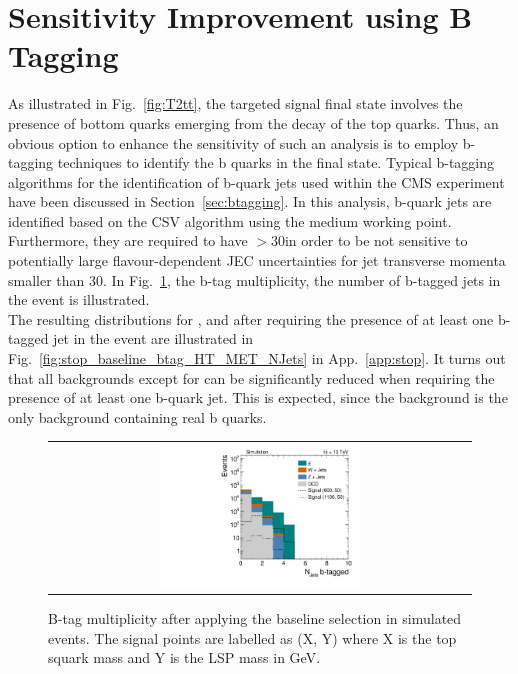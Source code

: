 \section{Sensitivity Improvement using B Tagging}
\label{sec:stop_btagging}
As illustrated in Fig.~\ref{fig:T2tt}, the targeted signal final state involves the presence of bottom quarks emerging from the decay of the top quarks. Thus, an obvious option to enhance the sensitivity of such an analysis is to employ b-tagging techniques to identify the b quarks in the final state. Typical b-tagging algorithms for the identification of b-quark jets used within the CMS experiment have been discussed in Section~\ref{sec:btagging}. In this analysis, b-quark jets are identified based on the CSV algorithm using the medium working point. Furthermore, they are required to have \pt$> 30$\gev in order to be not sensitive to potentially large flavour-dependent JEC uncertainties for jet transverse momenta smaller than 30\gev. In Fig.~\ref{fig:stop_baseline_btag}, the b-tag multiplicity, \ie the number of b-tagged jets in the event is illustrated. \\ %
The resulting distributions for \HT, \met and \NJets after requiring the presence of at least one b-tagged jet in the event are illustrated in Fig.~\ref{fig:stop_baseline_btag_HT_MET_NJets} in App.~\ref{app:stop}. It turns out that all backgrounds except for \ttbar can be significantly reduced when requiring the presence of at least one b-quark jet. This is expected, since the \ttbar background is the only background containing real b quarks.     
\begin{figure}[!t]
  \centering
  \begin{tabular}{c}
                \includegraphics[width=0.49\textwidth]{figures/Stop_DeltaPhiSelection_N_jets_btagged.pdf} 
  \end{tabular}
  \caption{B-tag multiplicity after applying the baseline selection in simulated events. The signal points are labelled as (X, Y) where X is the top squark mass and Y is the LSP mass in GeV.}
  \label{fig:stop_baseline_btag}
\end{figure}
